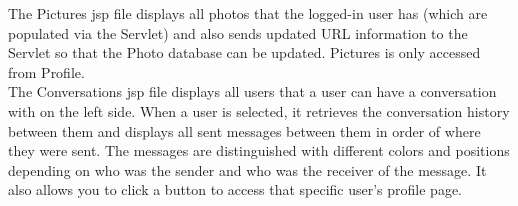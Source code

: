 \documentclass{article}
\begin{document}
\begin{enumerate}
        The Pictures jsp file displays all photos that the logged-in user has (which are populated via the Servlet) and also sends updated URL information to the Servlet so that the Photo database can be updated. Pictures is only accessed from Profile.\\
        The Conversations jsp file displays all users that a user can have a conversation with on the left side. When a user is selected, it retrieves the conversation history between them and displays all sent messages between them in order of where they were sent. The messages are distinguished with different colors and positions depending on who was the sender and who was the receiver of the message. It also allows you to click a button to access that specific user's profile page. 
    \end{enumerate}
\end{document}
